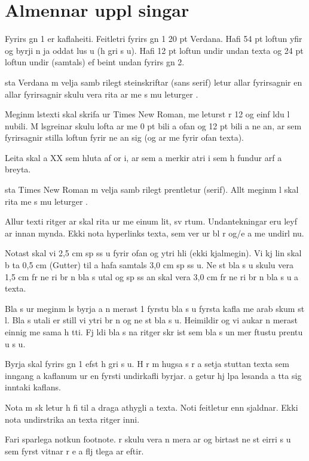 \documentclass{article}
\begin{document}
\section{Almennar uppl singar}
Fyrirs gn 1 er kaflaheiti. Feitletri  fyrirs gn 1   20 pt Verdana. Hafi  54 pt loftun yfir og byrji  n ja oddat lus u (h gri s u). Hafi  12 pt loftun undir   undan texta og 24 pt loftun undir (samtals) ef beint   undan fyrirs gn 2.

  sta  Verdana m  velja samb rilegt steinskriftar (sans serif) letur   allar fyrirsagnir en allar fyrirsagnir skulu   vera rita ar me  s mu leturger .

Meginm lstexti skal skrifa ur   Times New Roman, me  leturst r  12 og einf ldu l nubili. M lsgreinar skulu lofta ar me  0 pt bili a  ofan og 12 pt bili a  ne an,  ar sem fyrirsagnir stilla loftun fyrir ne an sig (og  ar me  fyrir ofan texta).

Leita skal a  XX sem hluta af or i,  ar sem  a  merkir atri i sem h fundur  arf a  breyta.

  sta  Times New Roman m  velja samb rilegt prentletur (serif). Allt meginm l skal   rita  me  s mu leturger . 

Allur texti ritger ar skal rita ur me  einum lit, sv rtum. Undantekningar eru leyf ar innan mynda. Ekki nota  hyperlinks    texta, sem   ver ur bl r og/e a me  undirl nu.

Notast skal vi  2,5 cm sp ss u fyrir ofan og   ytri hli  (ekki kjalmegin). Vi  kj lin skal b ta 0,5 cm (Gutter) til a  hafa samtals 3,0 cm sp ss u. Ne st   bla s u skulu vera 1,5 cm fr  ne ri br n   bla s utal og sp ss an skal vera 3,0 cm fr  ne ri br n bla s u a  texta.

Bla s ur meginm ls byrja a  n merast   1   fyrstu bla s u fyrsta kafla me  arab skum st l. Bla s utali  er still vi  ytri br n og ne st   bla s u. Heimildir og vi aukar n merast einnig me  sama h tti. Fj ldi bla s na   ritger  skr ist sem bla s un mer  ftustu prentu u s u.

Byrja skal fyrirs gn 1 efst   h gri s u. H r m  hugsa s r a  setja stuttan texta sem inngang a  kaflanum  ur en fyrsti undirkafli byrjar.  a  getur hj lpa  lesanda a   tta sig   inntaki kaflans.

Nota m  sk letur   h fi til a  draga athygli a  texta. Noti  feitletur enn sjaldnar. Ekki nota undirstrika an texta   ritger inni.

Fari  sparlega   notkun footnote.  r skulu vera n mera ar og birtast ne st    eirri s u sem fyrst vitnar    r e a flj tlega  ar   eftir.
\end{document}
